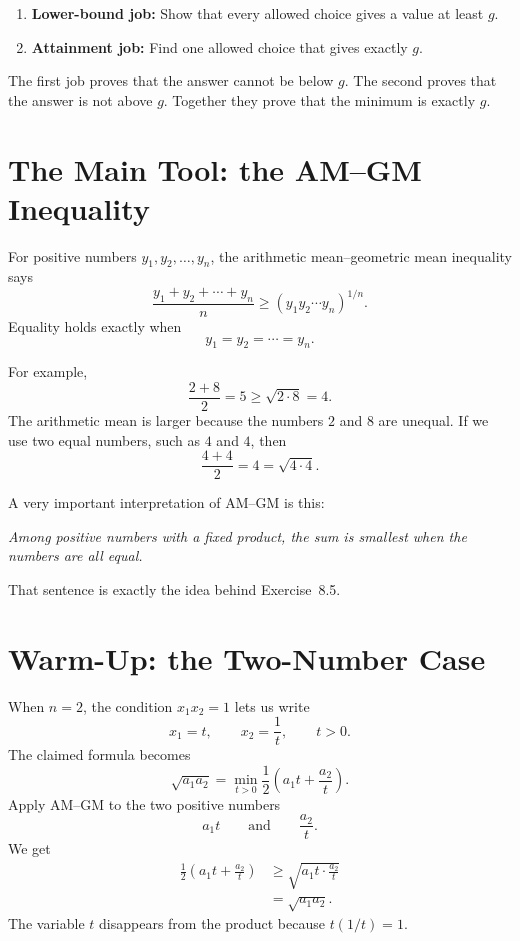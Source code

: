 \documentclass[11pt]{article}
\begin{document}
\begin{enumerate}
\item \textbf{Lower-bound job:} Show that every allowed choice gives a value at
least $g$.

\item \textbf{Attainment job:} Find one allowed choice that gives exactly $g$.
\end{enumerate}

The first job proves that the answer cannot be below $g$.  The second proves
that the answer is not above $g$.  Together they prove that the minimum is
exactly $g$.

\section{The Main Tool: the AM--GM Inequality}

For positive numbers $y_1,y_2,\ldots,y_n$, the arithmetic mean--geometric mean
inequality says
\begin{equation*}
\boxed{
 \frac{y_1+y_2+\cdots+y_n}{n}
 \ge
 (y_1y_2\cdots y_n)^{1/n}.
}
\tag{AM--GM}
\end{equation*}
Equality holds exactly when
\[
 y_1=y_2=\cdots=y_n.
\]

For example,
\[
 \frac{2+8}{2}=5
 \ge
 \sqrt{2\cdot8}=4.
\]
The arithmetic mean is larger because the numbers $2$ and $8$ are unequal.  If
we use two equal numbers, such as $4$ and $4$, then
\[
 \frac{4+4}{2}=4=\sqrt{4\cdot4}.
\]

A very important interpretation of AM--GM is this:

\begin{center}
\emph{Among positive numbers with a fixed product, the sum is smallest when the
numbers are all equal.}
\end{center}

That sentence is exactly the idea behind Exercise~8.5.

\section{Warm-Up: the Two-Number Case}

When $n=2$, the condition $x_1x_2=1$ lets us write
\[
 x_1=t,
 \qquad
 x_2=\frac1t,
 \qquad t>0.
\]
The claimed formula becomes
\[
 \sqrt{a_1a_2}
 =
 \min_{t>0}
 \frac12\left(a_1t+\frac{a_2}{t}\right).
\]
Apply AM--GM to the two positive numbers
\[
 a_1t
 \qquad\text{and}\qquad
 \frac{a_2}{t}.
\]
We get
\begin{align*}
 \frac12\left(a_1t+\frac{a_2}{t}\right)
 &\ge
 \sqrt{a_1t\cdot\frac{a_2}{t}}\\
 &=\sqrt{a_1a_2}.
\end{align*}
The variable $t$ disappears from the product because $t(1/t)=1$.
\end{document}
